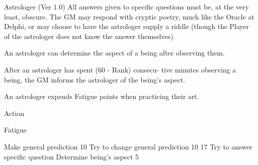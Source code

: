 \begin{Chapter}{Astrologer (Ver 1.0)}
All answers given to specific questions must be, at 
the very least, obscure. The GM may respond with 
cryptic  poetry,  much  like  the  Oracle  at  Delphi,  or 
may  choose  to  have  the  astrologer  supply  a  riddle 
(though the Player of the astrologer does not know 
the answer themselves). 

An  astrologer  can  determine  the  aspect  of  a 
being after observing them. 

After an astrologer has spent (60 - Rank) consecu-
tive  minutes  observing  a  being,  the  GM  informs 
the astrologer of the being’s aspect. 

An  astrologer  expends  Fatigue  points  when 
practicing their art. 

Action 

Fatigue 

Make general prediction  
10 
Try to change general prediction   10 
17 
Try to answer specific question 
Determine being’s aspect  
5 
\end{Chapter}

